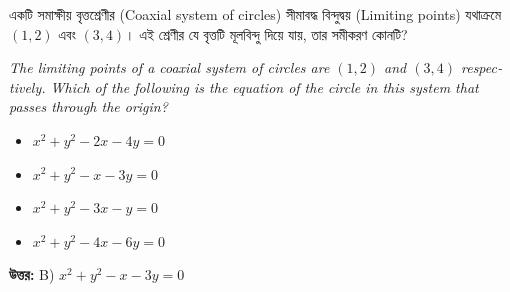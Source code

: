 \documentclass[12pt, a4paper]{article}
\begin{document}
\vspace{2em}

\begin{tcolorbox}[questionbox={প্রশ্ন (Question) 20}]
    \noindent
    একটি সমাক্ষীয় বৃত্তশ্রেণীর (Coaxial system of circles) সীমাবদ্ধ বিন্দুদ্বয় (Limiting points) যথাক্রমে $(1, 2)$ এবং $(3, 4)$। এই শ্রেণীর যে বৃত্তটি মূলবিন্দু দিয়ে যায়, তার সমীকরণ কোনটি?
    
    \vspace{0.8em}
    \begin{english}
    \noindent\textit{\color{darkgray}
    The limiting points of a coaxial system of circles are $(1, 2)$ and $(3, 4)$ respectively. Which of the following is the equation of the circle in this system that passes through the origin?
    }
    \end{english}
\end{tcolorbox}

\begin{itemize}[label={}, leftmargin=1cm, itemsep=0.5em]
    \item[\textbf{A)}] $x^2 + y^2 - 2x - 4y = 0$
    \item[\textbf{B)}] $x^2 + y^2 - x - 3y = 0$
    \item[\textbf{C)}] $x^2 + y^2 - 3x - y = 0$
    \item[\textbf{D)}] $x^2 + y^2 - 4x - 6y = 0$
\end{itemize}

\vspace{0.5em}
\begin{tcolorbox}[answerbox]
    \textbf{\color{success} উত্তর:} B) $x^2 + y^2 - x - 3y = 0$
\end{tcolorbox}
\vspace{1em}
\end{document}
